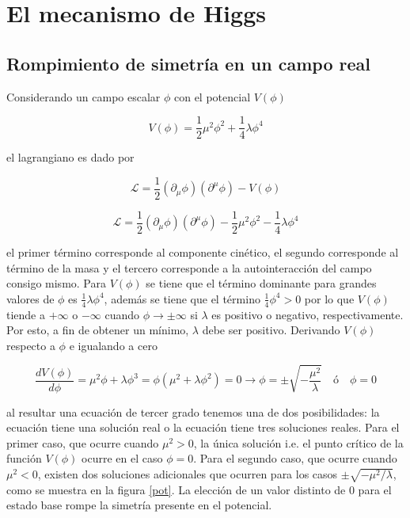 \usepackage{xr}



\chapter{El mecanismo de Higgs}

\section{Rompimiento de simetría en un campo real}

Considerando un campo escalar $\phi$ con el potencial $V(\phi)$

$$ V(\phi) = \frac{1}{2}\mu^2\phi^2 + \frac{1}{4}\lambda \phi^4 $$

el lagrangiano es dado por

$$ \mathcal{L} = \frac{1}{2}(\partial_{\mu}\phi)(\partial^{\mu}\phi) - V(\phi) $$

\begin{equation}
    \mathcal{L} = \frac{1}{2}(\partial_{\mu}\phi)(\partial^{\mu}\phi) - \frac{1}{2}\mu^2\phi^2 - \frac{1}{4}\lambda \phi^4 
    \label{mas1}
\end{equation}

el primer término corresponde al componente cinético, el segundo corresponde al término de la masa y el tercero corresponde a la autointeracción del campo consigo mismo. Para $V(\phi)$ se tiene que el término dominante para grandes valores de $\phi$ es $\frac{1}{4}\lambda\phi^4$, además se tiene que el término $\frac{1}{4}\phi^4>0$ por lo que $V(\phi)$ tiende a $+\infty$ o $-\infty$ cuando $\phi\rightarrow \pm\infty$ si $\lambda$ es positivo o negativo, respectivamente. Por esto, a fin de obtener un mínimo, $\lambda$ debe ser positivo. Derivando $V(\phi)$ respecto a $\phi$ e igualando a cero

$$ \frac{dV(\phi)}{d\phi} = \mu^2\phi + \lambda \phi^3 =\phi(\mu^2 + \lambda \phi^2) = 0 \rightarrow \phi = \pm \sqrt{-\frac{\mu^2}{\lambda}} \quad \text{\'o} \quad \phi = 0$$

al resultar una ecuación de tercer grado tenemos una de dos posibilidades: la ecuación tiene una solución real o la ecuación tiene tres soluciones reales. Para el primer caso, que ocurre cuando $\mu^2>0$, la única solución i.e. el punto crítico de la función $V(\phi)$ ocurre en el caso $\phi = 0$. Para el segundo caso, que ocurre cuando $\mu^2<0$, existen dos soluciones adicionales que ocurren para los casos $\pm\sqrt{-\mu^2/\lambda}$, como se muestra en la figura \ref{pot}. La elección de un valor distinto de 0 para el estado base rompe la simetría presente en el potencial.

